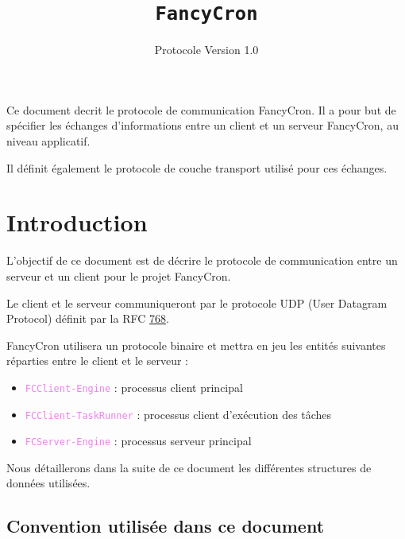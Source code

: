 \documentclass{bouygues-fr}
\begin{document}
\title{\texttt{FancyCron}}
\subtitle{Protocole Version 1.0}



\summary
{
  Ce document decrit le protocole de communication FancyCron.  Il a pour but de spécifier les échanges d'informations entre un client et un serveur FancyCron, au niveau applicatif.
  
  Il définit également le protocole de couche transport utilisé pour ces échanges.
}

\maketitle

\tableofcontents

\renewcommand{\labelitemi}{$\bullet$}
\renewcommand{\labelitemii}{$\circ$}


\chapter{Introduction}

L’objectif de ce document est de décrire le protocole de communication entre un serveur et un client pour le projet FancyCron.

Le client et le serveur communiqueront par le protocole UDP (User Datagram Protocol) définit par la RFC \href{http://tools.ietf.org/html/rfc768}{768}.

FancyCron utilisera un protocole binaire et mettra en jeu les entités suivantes réparties entre le client et le serveur :
\begin{itemize}
\item \textcolor{violet}{\texttt{FCClient-Engine}} : processus client principal
\item \textcolor{violet}{\texttt{FCClient-TaskRunner}} : processus client d'exécution des tâches
\item \textcolor{violet}{\texttt{FCServer-Engine}} : processus serveur principal
\end{itemize}
Nous détaillerons dans la suite de ce document les différentes structures de données utilisées.

\section{Convention utilisée dans ce document}
\end{document}
